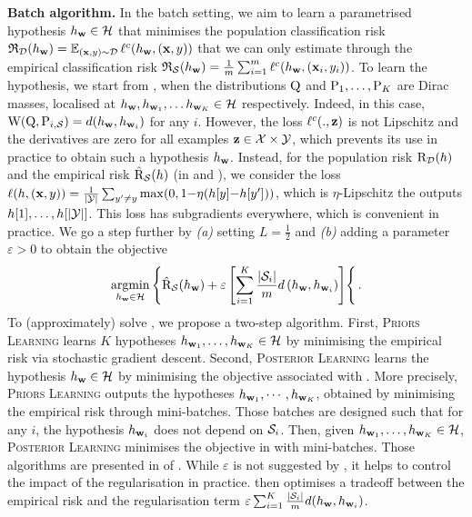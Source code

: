 \textbf{Batch algorithm.} In the batch setting, we aim to learn a parametrised hypothesis $h_{\wbf}\in\H$ that minimises the population classification risk $\Rfrak_{\D}(h_{\wbf}) = \EE_{(\x, y)\sim\D}\loss^{c}(h_{\wbf}, (\x, y))$ that we can only estimate through the empirical classification risk $\Rfrak_{\S}(h_{\wbf}) = \frac{1}{m}\sum_{i=1}^{m}\loss^{c}(h_{\wbf}, (\x_i, y_i))$.
To learn the hypothesis, we start from , when the distributions $\Q$ and $\P_1,\dots, \P_K$ are Dirac masses, localised at $h_{\wbf}, h_{\wbf_1},\dots h_{\wbf_K}\in\H$ respectively.
Indeed, in this case, $\W(\Q, \P_{i,\S}) = d(h_{\wbf}, h_{\wbf_i})$ for any $i$.
However, the loss $\loss^{c}(.,\z)$ is not Lipschitz and the derivatives are zero for all examples $\z\in\X\times\Y$, which prevents its use in practice to obtain such a hypothesis $h_{\wbf}$.
Instead, for the population risk $\Risk_{\D}(h)$ and the empirical risk $\Riskhat_{\S}(h)$ (in  and ), we consider the loss $\loss(h, (\x, y)) = \frac{1}{|\Y|}\sum_{y'\ne y} \max(0, 1{-} \eta(h[y]{-}h[y']))$, which is $\eta$-Lipschitz \wrt the outputs $h[1],\dots, h[|\Y|]$.
This loss has subgradients everywhere, which is convenient in practice.
We go a step further by {\it (a)}  setting $L=\frac{1}{2}$ and {\it (b)} adding a parameter $\varepsilon>0$ to obtain the objective
\begin{align}
    \label{eq:batch-alg-exp}
    \argmin_{h_{\wbf}\in\Hcal}\left\{ \Riskhat_{\S}(h_{\wbf}) + \varepsilon\LB\sum_{i=1}^{K} \frac{|\S_i|}{m} d\LP h_\wbf,h_{\wbf_i}\RP\RB\right\{.
\end{align}
To (approximately) solve , we propose a two-step algorithm.
First, \textsc{Priors Learning} learns $K$ hypotheses $h_{\wbf_1}, \dots, h_{\wbf_K} \in \H$ by minimising the empirical risk via stochastic gradient descent.
Second, \textsc{Posterior Learning} learns the hypothesis $h_{\wbf}\in\H$ by minimising the objective associated with .
More precisely, \textsc{Priors Learning} outputs the hypotheses $h_{\wbf_1},\cdots,h_{\wbf_K}$, obtained by minimising the empirical risk through mini-batches.
Those batches are designed such that for any $i$, the hypothesis $h_{\wbf_i}$ does not depend on $\S_i$.
Then, given $h_{\wbf_1}, \dots, h_{\wbf_K} \in \H$, \textsc{Posterior Learning} minimises the objective in  with mini-batches.
Those algorithms are presented in  of .
While $\varepsilon$ is not suggested by , it helps to control the impact of the regularisation in practice.
 then optimises a tradeoff between the empirical risk and the regularisation term $\varepsilon\sum_{i=1}^{K} \frac{|\S_i|}{m} d(h_{\wbf}, h_{\wbf_i})$.

